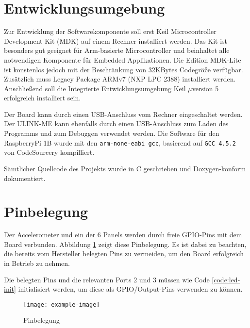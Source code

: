 \section{Entwicklungsumgebung}
Zur Entwicklung der Softwarekomponente soll erst Keil\textsuperscript{\scriptsize\textregistered} Microcontroller Development Kit (MDK) auf einem Rechner installiert werden. Das Kit ist besonders gut geeignet für Arm\textsuperscript{\scriptsize\textregistered}-basierte Microcontroller und beinhaltet alle notwendigen Komponente für Embedded Applikationen. Die Edition MDK-Lite ist konstenlos jedoch mit der Beschränkung von 32KBytes Codegröße verfügbar. Zusätzlich muss Legacy Package ARMv7 (NXP LPC 2388) installiert werden. Anschließend soll die Integrierte Entwicklungsumgebung Keil $\mu$version 5 erfolgreich installiert sein.

Der Board kann durch einen USB-Anschluss vom Rechner eingeschaltet werden. Der ULINK-ME kann ebenfalls durch einen USB-Anschluss zum Laden des Programms und zum Debuggen verwendet werden.
Die Software für den RaspberryPi 1B wurde mit den \texttt{arm-none-eabi gcc}, basierend auf \texttt{GCC 4.5.2} von CodeSourcery kompilliert.

Sämtlicher Quellcode des Projekts wurde in C geschrieben und Doxygen-konform dokumentiert.


\section{Pinbelegung}
Der Accelerometer und ein der 6 Panels werden durch freie GPIO-Pins mit dem Board verbunden. Abbildung \ref{fig:pins} zeigt diese Pinbelegung. Es ist dabei zu beachten, die bereits vom Hersteller belegten Pins zu vermeiden, um den Board erfolgreich in Betrieb zu nehmen.

Die belegten Pins und die relevanten Ports 2 und 3 müssen wie Code \ref{code:led-init} initialisiert werden, um diese als GPIO/Output-Pins verwenden zu können.

\begin{figure}
	\centering
	\texttt{[image: example-image]}
	\caption[Pinbelegung]{Pinbelegung}
	\label{fig:pins}
\end{figure}

\newpage